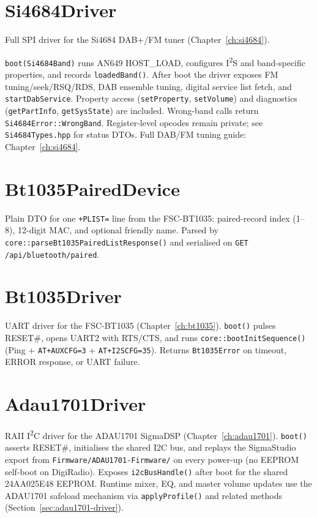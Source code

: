 \section{Si4684Driver}\label{cls:Si4684Driver}
Full SPI driver for the Si4684 DAB+/FM tuner (Chapter~\ref{ch:si4684}).

\texttt{boot(Si4684Band)} runs AN649 HOST\_LOAD, configures I\textsuperscript{2}S
and band-specific properties, and records \texttt{loadedBand()}. After boot the
driver exposes FM tuning/seek/RSQ/RDS, DAB ensemble tuning, digital service list
fetch, and \texttt{startDabService}. Property access (\texttt{setProperty},
\texttt{setVolume}) and diagnostics (\texttt{getPartInfo}, \texttt{getSysState})
are included. Wrong-band calls return \texttt{Si4684Error::WrongBand}.
Register-level opcodes remain private; see \texttt{Si4684Types.hpp} for status
DTOs. Full DAB/FM tuning guide: Chapter~\ref{ch:si4684}.

\section{Bt1035PairedDevice}\label{cls:Bt1035PairedDevice}
Plain DTO for one \texttt{+PLIST=} line from the FSC-BT1035: paired-record
index (1--8), 12-digit MAC, and optional friendly name. Parsed by
\texttt{core::parseBt1035PairedListResponse()} and serialised on
\texttt{GET /api/bluetooth/paired}.

\section{Bt1035Driver}\label{cls:Bt1035Driver}
UART driver for the FSC-BT1035 (Chapter~\ref{ch:bt1035}). \texttt{boot()}
pulses RESET\#, opens UART2 with RTS/CTS, and runs
\texttt{core::bootInitSequence()} (Ping + \texttt{AT+AUXCFG=3} +
\texttt{AT+I2SCFG=35}). Returns
\texttt{Bt1035Error} on timeout, ERROR response, or UART failure.

\section{Adau1701Driver}\label{cls:Adau1701Driver}
RAII I\textsuperscript{2}C driver for the ADAU1701 SigmaDSP
(Chapter~\ref{ch:adau1701}). \texttt{boot()} asserts RESET\#,
initialises the shared I2C bus, and replays the SigmaStudio export from
\texttt{Firmware/ADAU1701-Firmware/} on every power-up (no EEPROM self-boot
on DigiRadio). Exposes \texttt{i2cBusHandle()} after boot for the shared
24AA025E48 EEPROM. Runtime mixer, EQ, and master volume updates use the
ADAU1701 safeload mechanism via \texttt{applyProfile()} and related methods
(Section~\ref{sec:adau1701-driver}).

